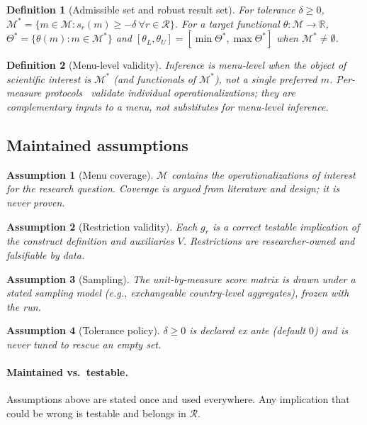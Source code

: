 \documentclass[10pt,letterpaper]{article}
\newtheorem{definition}{Definition}[section]
\newtheorem{assumption}{Assumption}[section]
\newcommand{\M}{\ensuremath{\mathcal{M}}}
\newcommand{\Rset}{\mathcal{R}}
\begin{document}
\begin{definition}[Admissible set and robust result set]
For tolerance $\delta\ge 0$,
$\M^*=\{m\in\M:s_r(m)\ge-\delta\ \forall r\in\Rset\}$.
For a target functional $\theta:\M\to\mathbb{R}$,
$\Theta^*=\{\theta(m):m\in\M^*\}$ and
$[\theta_L,\theta_U]=[\min\Theta^*,\max\Theta^*]$ when $\M^*\neq\emptyset$.
\end{definition}

\begin{definition}[Menu-level validity]
Inference is \emph{menu-level} when the object of scientific interest is $\M^*$ (and functionals of $\M^*$), not a single preferred $m$.
Per-measure protocols~\cite{proxy2026,halterman2024} validate individual operationalizations; they are complementary inputs to a menu, not substitutes for menu-level inference.
\end{definition}

\subsection{Maintained assumptions}
\begin{assumption}[Menu coverage]
$\M$ contains the operationalizations of interest for the research question.
Coverage is argued from literature and design; it is never proven.
\end{assumption}

\begin{assumption}[Restriction validity]
Each $g_r$ is a correct testable implication of the construct definition and auxiliaries $V$.
Restrictions are researcher-owned and falsifiable by data.
\end{assumption}

\begin{assumption}[Sampling]
The unit-by-measure score matrix is drawn under a stated sampling model (e.g., exchangeable country-level aggregates), frozen with the run.
\end{assumption}

\begin{assumption}[Tolerance policy]
$\delta\ge 0$ is declared ex ante (default $0$) and is never tuned to rescue an empty set.
\end{assumption}

\paragraph{Maintained vs.\ testable.}
Assumptions above are stated once and used everywhere.
Any implication that could be wrong is testable and belongs in $\Rset$.
\end{document}
